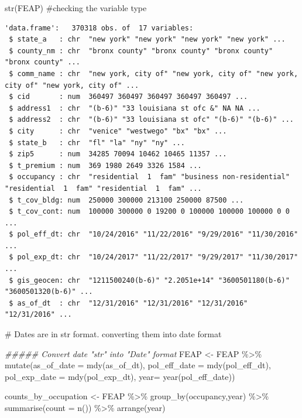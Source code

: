 \documentclass[
  letterpaper,
  DIV=11,
  numbers=noendperiod]{scrartcl}
\newenvironment{Shaded}{\begin{snugshade}}{\end{snugshade}}
\newcommand{\AttributeTok}[1]{\textcolor[rgb]{0.40,0.45,0.13}{#1}}
\newcommand{\CommentTok}[1]{\textcolor[rgb]{0.37,0.37,0.37}{#1}}
\newcommand{\DocumentationTok}[1]{\textcolor[rgb]{0.37,0.37,0.37}{\textit{#1}}}
\newcommand{\FunctionTok}[1]{\textcolor[rgb]{0.28,0.35,0.67}{#1}}
\newcommand{\NormalTok}[1]{\textcolor[rgb]{0.00,0.23,0.31}{#1}}
\newcommand{\OtherTok}[1]{\textcolor[rgb]{0.00,0.23,0.31}{#1}}
\newcommand{\SpecialCharTok}[1]{\textcolor[rgb]{0.37,0.37,0.37}{#1}}
\begin{document}
\begin{Shaded}
\begin{Highlighting}[]
\FunctionTok{str}\NormalTok{(FEAP)  }\CommentTok{\#checking the variable type }
\end{Highlighting}
\end{Shaded}

\begin{verbatim}
'data.frame':   370318 obs. of  17 variables:
 $ state_a   : chr  "new york" "new york" "new york" "new york" ...
 $ county_nm : chr  "bronx county" "bronx county" "bronx county" "bronx county" ...
 $ comm_name : chr  "new york, city of" "new york, city of" "new york, city of" "new york, city of" ...
 $ cid       : num  360497 360497 360497 360497 360497 ...
 $ address1  : chr  "(b-6)" "33 louisiana st ofc &" NA NA ...
 $ address2  : chr  "(b-6)" "33 louisiana st ofc" "(b-6)" "(b-6)" ...
 $ city      : chr  "venice" "westwego" "bx" "bx" ...
 $ state_b   : chr  "fl" "la" "ny" "ny" ...
 $ zip5      : num  34285 70094 10462 10465 11357 ...
 $ t_premium : num  369 1980 2649 3326 1584 ...
 $ occupancy : chr  "residential  1  fam" "business non-residential" "residential  1  fam" "residential  1  fam" ...
 $ t_cov_bldg: num  250000 300000 213100 250000 87500 ...
 $ t_cov_cont: num  100000 300000 0 19200 0 100000 100000 100000 0 0 ...
 $ pol_eff_dt: chr  "10/24/2016" "11/22/2016" "9/29/2016" "11/30/2016" ...
 $ pol_exp_dt: chr  "10/24/2017" "11/22/2017" "9/29/2017" "11/30/2017" ...
 $ gis_geocen: chr  "1211500240(b-6)" "2.2051e+14" "3600501180(b-6)" "3600501320(b-6)" ...
 $ as_of_dt  : chr  "12/31/2016" "12/31/2016" "12/31/2016" "12/31/2016" ...
\end{verbatim}

\begin{Shaded}
\begin{Highlighting}[]
\CommentTok{\# Dates are in str format. converting them into date format }

\DocumentationTok{\#\#\#\#\# Convert date "str" into "Date" format}
\NormalTok{FEAP }\OtherTok{\textless{}{-}}\NormalTok{ FEAP }\SpecialCharTok{\%\textgreater{}\%} 
  \FunctionTok{mutate}\NormalTok{(}\AttributeTok{as\_of\_date =} \FunctionTok{mdy}\NormalTok{(as\_of\_dt),}
         \AttributeTok{pol\_eff\_date =} \FunctionTok{mdy}\NormalTok{(pol\_eff\_dt),}
         \AttributeTok{pol\_exp\_date =} \FunctionTok{mdy}\NormalTok{(pol\_exp\_dt),}
         \AttributeTok{year=} \FunctionTok{year}\NormalTok{(pol\_eff\_date))}

\NormalTok{counts\_by\_occupation }\OtherTok{\textless{}{-}}\NormalTok{ FEAP }\SpecialCharTok{\%\textgreater{}\%} 
  \FunctionTok{group\_by}\NormalTok{(occupancy,year) }\SpecialCharTok{\%\textgreater{}\%} 
  \FunctionTok{summarise}\NormalTok{(}\AttributeTok{count =} \FunctionTok{n}\NormalTok{()) }\SpecialCharTok{\%\textgreater{}\%} 
  \FunctionTok{arrange}\NormalTok{(year)}
\end{Highlighting}
\end{Shaded}
\end{document}
